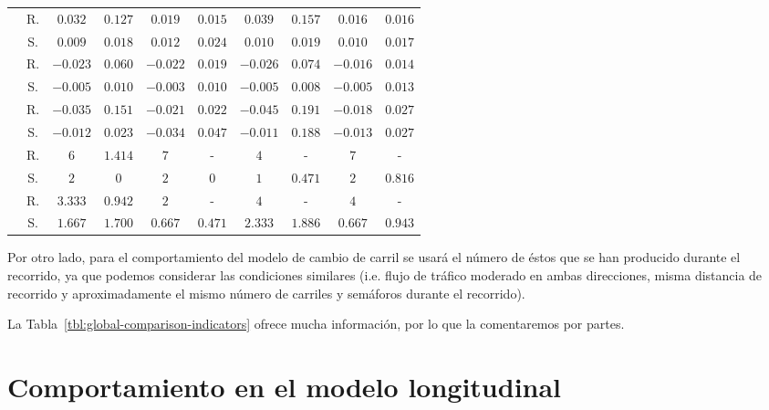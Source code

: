 \begin{table*}[!b]
\begin{tabular}{cccccccccc}
		\rowcolor{black!20} \cellcolor{white} \multirow{2}{*}{\textbf{$JLC$}} & R. & $0.032$  & $0.127$  & $0.019$  & $0.015$  & $0.039$  & $0.157$  & $0.016$  & $0.016$  \\
		& S. & $0.009$  & $0.018$  & $0.012$  & $0.024$  & $0.010$  & $0.019$  & $0.010$  & $0.017$  \\
		\rowcolor{black!20} \cellcolor{white} \multirow{2}{*}{\textbf{$JIF$}} & R. & $-0.023$ & $0.060$  & $-0.022$ & $0.019$  & $-0.026$ & $0.074$  & $-0.016$ & $0.014$  \\
		& S. & $-0.005$ & $0.010$  & $-0.003$ & $0.010$  & $-0.005$ & $0.008$  & $-0.005$ & $0.013$  \\
		\rowcolor{black!20} \cellcolor{white} \multirow{2}{*}{\textbf{$JFF$}} & R. & $-0.035$ & $0.151$  & $-0.021$ & $0.022$  & $-0.045$ & $0.191$  & $-0.018$ & $0.027$  \\
		& S. & $-0.012$ & $0.023$  & $-0.034$ & $0.047$  & $-0.011$ & $0.188$  & $-0.013$ & $0.027$  \\
		\rowcolor{black!20} \cellcolor{white} \multirow{2}{*}{\textbf{$LC$}}  & R. & $6$     & $1.414$ & $7$     &  -      & $4$     &    -    & $7$     & -       \\
		                                                                      & S. & $2$     & $0$     & $2$     & $0$     & $1$     & $0.471$ & $2$     & $0.816$ \\
		\rowcolor{black!20} \cellcolor{white} \multirow{2}{*}{\textbf{$RC$}}  & R. & $3.333$ & $0.942$ & $2$     &  -      & $4$     &    -    & $4$     &    -    \\
		                                                                      & S. & $1.667$ & $1.700$ & $0.667$ & $0.471$ & $2.333$ & $1.886$ & $0.667$ & $0.943$ \\
		\bottomrule
	\end{tabular}
\end{table*}

Por otro lado, para el comportamiento del modelo de cambio de carril se usará el número de éstos que se han producido durante el recorrido, ya que podemos considerar las condiciones similares (i.e. flujo de tráfico moderado en ambas direcciones, misma distancia de recorrido y aproximadamente el mismo número de carriles y semáforos durante el recorrido).

La Tabla~\ref{tbl:global-comparison-indicators} ofrece mucha información, por lo que la comentaremos por partes.

\section{Comportamiento en el modelo longitudinal}


